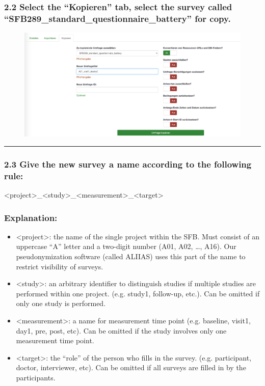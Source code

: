 \subsubsection*{2.2 Select the “Kopieren” tab, select the survey called “SFB289\_standard\_questionnaire\_battery” for copy. }
\begin{figure}[H]
\includegraphics[width=1.0\textwidth]{docs/fig/ls_sop2.2.png}
\end{figure}

\par\noindent\rule{\textwidth\color{pniblue}}{0.4pt}
\subsubsection*{2.3 Give the new survey a name according to the following rule:} <project>\_<study>\_<measurement>\_<target>

\subsubsection*{Explanation:}
\begin{itemize}
    \item <project>: the name of the single project within the SFB. Must consist of an uppercase “A” letter and a two-digit number (A01, A02, …, A16). Our pseudonymization software (called ALIIAS) uses this part of the name to restrict visibility of surveys.
    \item <study>: an arbitrary identifier to distinguish studies if multiple studies are performed within one project. (e.g. study1, follow-up, etc.). Can be omitted if only one study is performed. 
    \item <measurement>: a name for measurement time point (e.g. baseline, visit1, day1, pre, post, etc). Can be omitted if the study involves only one measurement time point.
    \item <target>: the “role” of the person who fills in the survey. (e.g. participant, doctor, interviewer, etc). Can be omitted if all surveys are filled in by the participants.
\end{itemize}

